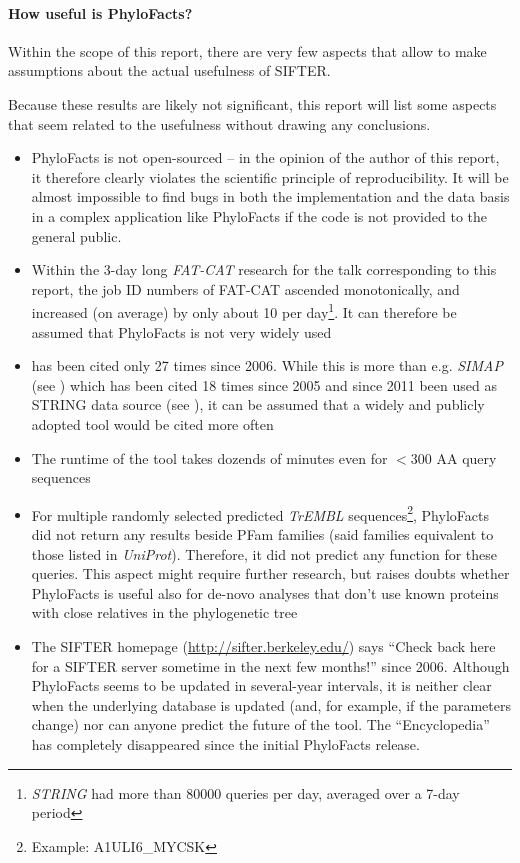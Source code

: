 \documentclass[pdftex,paper=A4,DIV=calc,titlepage,12pt]{scrartcl}
\newtheorem[L]{boxedDefinition}{Definition}
\begin{document}
\paragraph{How useful is PhyloFacts?}
Within the scope of this report, there are very few aspects that allow to make assumptions about the actual usefulness of SIFTER.

Because these results are likely not significant, this report will list some aspects that seem related to the usefulness without drawing any conclusions.

\begin{itemize}
 \item PhyloFacts is not open-sourced -- in the opinion of the author of this report, it therefore clearly violates the scientific principle of reproducibility. It will be almost impossible to find bugs in both the implementation and the data basis in a complex application like PhyloFacts if the code is not provided to the general public.
 \item Within the 3-day long \textit{FAT-CAT} research for the talk corresponding to this report, the job ID numbers of FAT-CAT ascended monotonically, and increased (on average) by only about 10 per day\footnote{\textit{STRING} had more than 80000 queries per day, averaged over a 7-day period}. It can therefore be assumed that PhyloFacts is not very widely used
 \item \cite{krishnamurthy2006phylofacts} has been cited only 27 times since 2006. While this is more than e.g. \textit{SIMAP} (see \cite{arnold2005simap}) which has been cited 18 times since 2005 and since 2011 been used as STRING data source (see \cite{szklarczyk2011string}), it can be assumed that a widely and publicly adopted tool would be cited more often
 \item The runtime of the tool takes dozends of minutes even for $<300$ AA query sequences
  \item For multiple randomly selected predicted \textit{TrEMBL} sequences\footnote{Example: A1ULI6\_MYCSK}, PhyloFacts did not return any results beside PFam families (said families equivalent to those listed in \textit{UniProt}). Therefore, it did not predict any function for these queries. This aspect might require further research, but raises doubts whether PhyloFacts is useful also for de-novo analyses that don't use known proteins with close relatives in the phylogenetic tree
 \item The SIFTER homepage (\url{http://sifter.berkeley.edu/}) says ``Check back here for a SIFTER server sometime in the next few months!'' since 2006. Although PhyloFacts seems to be updated in several-year intervals, it is neither clear when the underlying database is updated (and, for example, if the parameters change) nor can anyone predict the future of the tool. The ``Encyclopedia'' has completely disappeared since the initial PhyloFacts release.

\end{itemize}
\end{document}
